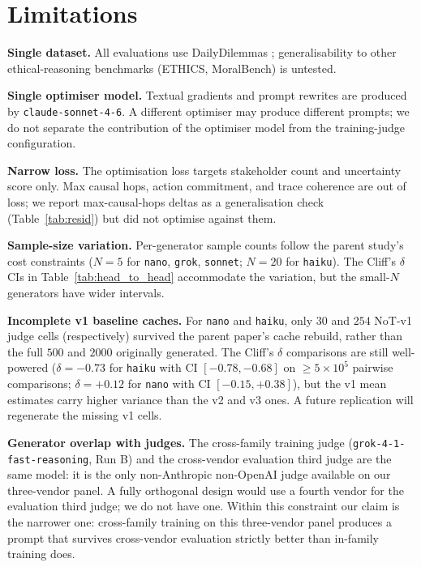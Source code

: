 \documentclass[11pt]{article}
\begin{document}
\section*{Limitations}
\label{sec:limitations}

\textbf{Single dataset.}
All evaluations use DailyDilemmas \citep{chiu24}; generalisability to other ethical-reasoning benchmarks (ETHICS, MoralBench) is untested.

\textbf{Single optimiser model.}
Textual gradients and prompt rewrites are produced by \texttt{claude-sonnet-4-6}.
A different optimiser may produce different prompts; we do not separate the contribution of the optimiser model from the training-judge configuration.

\textbf{Narrow loss.}
The optimisation loss targets stakeholder count and uncertainty score only.
Max causal hops, action commitment, and trace coherence are out of loss; we report max-causal-hops deltas as a generalisation check (Table~\ref{tab:resid}) but did not optimise against them.

\textbf{Sample-size variation.}
Per-generator sample counts follow the parent study's cost constraints ($N = 5$ for \texttt{nano}, \texttt{grok}, \texttt{sonnet}; $N = 20$ for \texttt{haiku}).
The Cliff's $\delta$ CIs in Table~\ref{tab:head_to_head} accommodate the variation, but the small-$N$ generators have wider intervals.

\textbf{Incomplete v1 baseline caches.}
For \texttt{nano} and \texttt{haiku}, only $30$ and $254$ NoT-v1 judge cells (respectively) survived the parent paper's cache rebuild, rather than the full $500$ and $2000$ originally generated.
The Cliff's $\delta$ comparisons are still well-powered ($\delta = -0.73$ for \texttt{haiku} with CI $[-0.78, -0.68]$ on $\geq 5 \times 10^5$ pairwise comparisons; $\delta = +0.12$ for \texttt{nano} with CI $[-0.15, +0.38]$), but the v1 mean estimates carry higher variance than the v2 and v3 ones.
A future replication will regenerate the missing v1 cells.

\textbf{Generator overlap with judges.}
The cross-family training judge (\texttt{grok-4-1-fast-reasoning}, Run B) and the cross-vendor evaluation third judge are the same model: it is the only non-Anthropic non-OpenAI judge available on our three-vendor panel.
A fully orthogonal design would use a fourth vendor for the evaluation third judge; we do not have one.
Within this constraint our claim is the narrower one: cross-family training on this three-vendor panel produces a prompt that survives cross-vendor evaluation strictly better than in-family training does.
\end{document}
